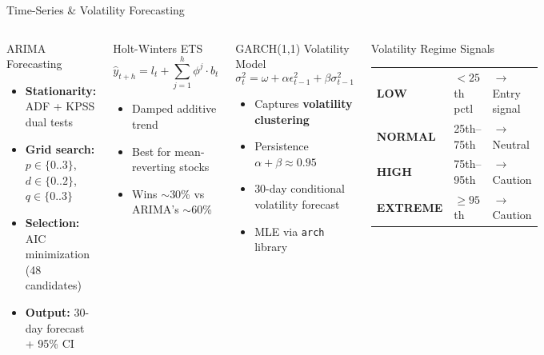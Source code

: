 \documentclass[aspectratio=169, 11pt]{beamer}
\begin{document}
\begin{frame}{Time-Series \& Volatility Forecasting}
\begin{columns}[T]
\begin{block}{ARIMA Forecasting}
\small
\begin{itemize}
  \item \textbf{Stationarity:} ADF + KPSS dual tests
  \item \textbf{Grid search:} $p \in \{0..3\}$, $d \in \{0..2\}$, $q \in \{0..3\}$
  \item \textbf{Selection:} AIC minimization (48 candidates)
  \item \textbf{Output:} 30-day forecast + 95\% CI
\end{itemize}
\end{block}

\vspace{0.15cm}
\begin{block}{Holt-Winters ETS}
\small
$$\hat{y}_{t+h} = l_t + \sum_{j=1}^{h} \phi^j \cdot b_t$$
\begin{itemize}
  \item Damped additive trend
  \item Best for mean-reverting stocks
  \item Wins $\sim$30\% vs ARIMA's $\sim$60\%
\end{itemize}
\end{block}

\begin{block}{GARCH(1,1) Volatility Model}
\small
$$\sigma_t^2 = \omega + \alpha\epsilon_{t-1}^2 + \beta\sigma_{t-1}^2$$
\begin{itemize}
  \item Captures \textbf{volatility clustering}
  \item Persistence $\alpha + \beta \approx 0.95$
  \item 30-day conditional volatility forecast
  \item MLE via \texttt{arch} library
\end{itemize}
\end{block}

\vspace{0.15cm}
\begin{exampleblock}{Volatility Regime Signals}
\footnotesize
\begin{tabular}{@{}lll@{}}
  \textcolor{ppGreen}{\textbf{LOW}} & $< 25$th pctl & $\rightarrow$ Entry signal \\
  \textcolor{ppAmber}{\textbf{NORMAL}} & 25th--75th & $\rightarrow$ Neutral \\
  \textcolor{ppRed}{\textbf{HIGH}} & 75th--95th & $\rightarrow$ Caution \\
  \textcolor{ppRed!80!black}{\textbf{EXTREME}} & $\geq 95$th & $\rightarrow$ Caution \\
\end{tabular}
\end{exampleblock}
\end{columns}
\end{frame}
\end{document}
